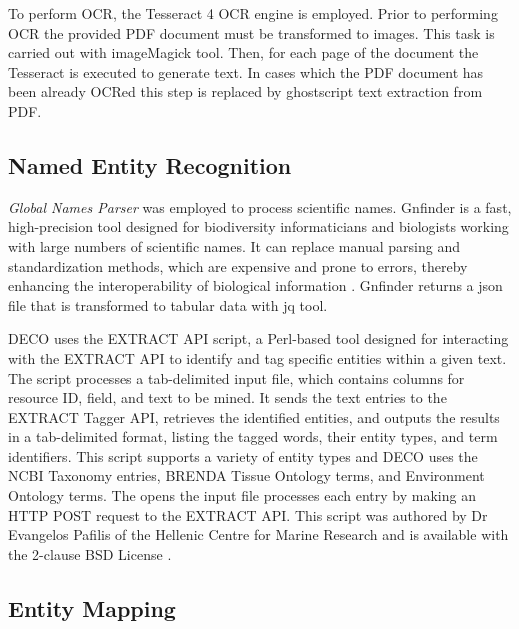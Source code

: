 To perform OCR, the Tesseract 4 OCR engine is employed. 
Prior to performing OCR the provided PDF document must be transformed to images. This 
task is carried out with imageMagick tool.
Then, for each page of the document the Tesseract is executed to generate text.
In cases which the PDF document has been 
already OCRed this step is replaced by ghostscript text extraction from PDF.
    

    \subsection{Named Entity Recognition}
\textit{Global Names Parser} was employed to process scientific names. Gnfinder
is a fast, high-precision tool designed for biodiversity informaticians and
biologists working with large numbers of scientific names.
It can replace manual parsing and standardization methods, which are expensive
and prone to errors, thereby enhancing the interoperability of biological information \parencite{mozzherin_gnamesgnfinder_2022}.
Gnfinder returns a json file that is transformed to tabular data with jq tool.

DECO uses the EXTRACT API script, a Perl-based tool designed for interacting
with the EXTRACT API to identify and tag specific entities within a given text.
The script processes a tab-delimited input file, which contains columns for resource ID,
field, and text to be mined. It sends the text entries to the EXTRACT Tagger API,
retrieves the identified entities, and outputs the results in a tab-delimited format,
listing the tagged words, their entity types, and term identifiers.
This script supports a variety of entity types and DECO uses the NCBI Taxonomy
entries, BRENDA Tissue Ontology terms, and Environment Ontology terms.
The opens the input file processes each entry by making an HTTP POST request to the EXTRACT API.
This script was authored by Dr Evangelos Pafilis of the Hellenic Centre for Marine Research 
and is available with the 2-clause BSD License \parencite{pafilis2016extract}.

    \subsection{Entity Mapping}
    
